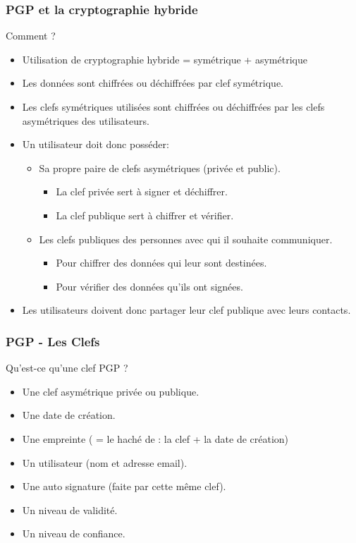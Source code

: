 \begin{frame}
    \frametitle{\color{white}PGP et la cryptographie hybride}
    \begin{block}{Comment ?}
      \begin{itemize}
         \item Utilisation de cryptographie hybride = symétrique + asymétrique
         \item Les données sont chiffrées ou déchiffrées par clef symétrique.
   \item Les clefs symétriques utilisées sont chiffrées ou déchiffrées par les clefs asymétriques des utilisateurs.
         \item Un utilisateur doit donc posséder:
    \begin{itemize}
      \item Sa propre paire de clefs asymétriques (privée et public).
      \begin{itemize}
        \item La clef privée sert à signer et déchiffrer.
        \item La clef publique sert à chiffrer et vérifier.
      \end{itemize}
      \item Les clefs publiques des personnes avec qui il souhaite communiquer.
      \begin{itemize}
        \item Pour chiffrer des données qui leur sont destinées.
        \item Pour vérifier des données qu'ils ont signées.
      \end{itemize}
    \end{itemize}
   \item Les utilisateurs doivent donc partager leur clef publique avec leurs contacts.
       \end{itemize} 
    \end{block}
\end{frame}

\begin{frame}
    \frametitle{\color{white}PGP - Les Clefs}
    \begin{block}{Qu'est-ce qu’une clef PGP ?}
      \begin{itemize}
    \item Une clef asymétrique privée ou publique.
    \item Une date de création.
    \item Une empreinte ( = le haché de : la clef + la date de création)
    \item Un utilisateur (nom et adresse email).
    \item Une auto signature (faite par cette même clef).
    \item Un niveau de validité.
    \item Un niveau de confiance.
       \end{itemize} 
    \end{block}
\end{frame}

